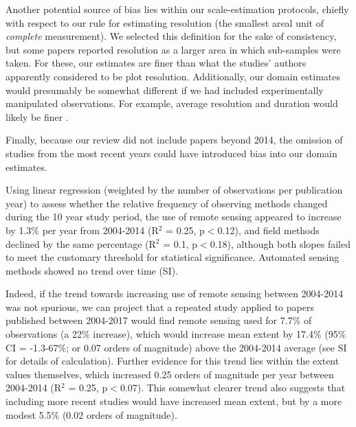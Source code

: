 \documentclass[12pt]{article}
\begin{document}
Another potential source of bias lies within our scale-estimation protocols, chiefly with respect to our rule for estimating resolution (the smallest areal unit of \emph{complete} measurement). We selected this definition for the sake of consistency, but some papers reported resolution as a larger area in which sub-samples were taken. For these, our estimates are finer than what the studies' authors apparently considered to be plot resolution. Additionally, our domain estimates would presumably be somewhat different if we had included experimentally manipulated observations. For example, average resolution and duration would likely be finer \cite{tilman_ecological_1989,kareiva_spatial_1988}.  

Finally, because our review did not include papers beyond 2014, the omission of studies from the most recent years could have introduced bias into our domain estimates. 

Using linear regression (weighted by the number of observations per publication year) to assess whether the relative frequency of observing methods changed during the 10 year study period, the use of remote sensing appeared to increase by 1.3\% per year from 2004-2014 (R$^2$ = 0.25, p$<$0.12), and field methods declined by the same percentage (R$^2$ = 0.1, p$<$0.18), although both slopes failed to meet the customary threshold for statistical significance. Automated sensing methods showed no trend over time (SI). 

Indeed, if the trend towards increasing use of remote sensing between 2004-2014 was not spurious, we can project that a repeated study applied to papers published between 2004-2017 would find remote sensing used for 7.7\% of observations (a 22\% increase), which would increase mean extent by 17.4\% (95\% CI = -1.3-67\%;  or 0.07 orders of magnitude) above the 2004-2014 average (see SI for details of calculation). Further evidence for this trend lies within the extent values themselves, which increased 0.25 orders of magnitude per year between 2004-2014 (R$^2$ = 0.25, p$<$0.07). This somewhat clearer trend also suggests that including more recent studies would have increased mean extent, but by a more modest 5.5\% (0.02 orders of magnitude).  
\end{document}

